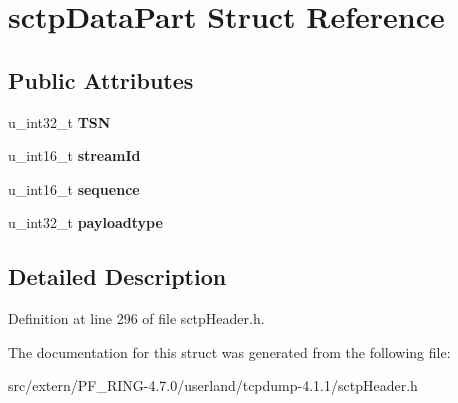 \hypertarget{structsctp_data_part}{
\section{sctpDataPart Struct Reference}
\label{structsctp_data_part}
}
\subsection*{Public Attributes}
\begin{DoxyCompactItemize}
\item 
\hypertarget{structsctp_data_part_a835ed26226d58920b67fe1ace64deb3a}{
u\_\-int32\_\-t {\bfseries TSN}}
\label{structsctp_data_part_a835ed26226d58920b67fe1ace64deb3a}

\item 
\hypertarget{structsctp_data_part_ae8627edeeda62f92e6be9bd9fe448060}{
u\_\-int16\_\-t {\bfseries streamId}}
\label{structsctp_data_part_ae8627edeeda62f92e6be9bd9fe448060}

\item 
\hypertarget{structsctp_data_part_a2400c484b2975e6c4f9031ad3c6fb4ac}{
u\_\-int16\_\-t {\bfseries sequence}}
\label{structsctp_data_part_a2400c484b2975e6c4f9031ad3c6fb4ac}

\item 
\hypertarget{structsctp_data_part_a2d2138e3783f5fc1d54654de9e455b51}{
u\_\-int32\_\-t {\bfseries payloadtype}}
\label{structsctp_data_part_a2d2138e3783f5fc1d54654de9e455b51}

\end{DoxyCompactItemize}


\subsection{Detailed Description}


Definition at line 296 of file sctpHeader.h.



The documentation for this struct was generated from the following file:\begin{DoxyCompactItemize}
\item 
src/extern/PF\_\-RING-\/4.7.0/userland/tcpdump-\/4.1.1/sctpHeader.h\end{DoxyCompactItemize}
